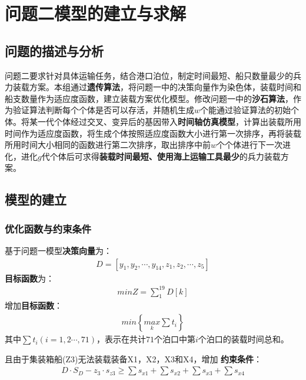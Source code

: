 \documentclass{whutmod}
\begin{document}
	  
	  
	
		
	\section{问题二模型的建立与求解}
	\subsection{问题的描述与分析}

	问题二要求针对具体运输任务，结合港口泊位，制定时间最短、船只数量最少的兵力装载方案。本组通过\textbf{遗传算法}，将问题一中的决策向量作为染色体，装载时间和船支数量作为适应度函数，建立装载方案优化模型。修改问题一中的\textbf{沙石算法}，作为验证算法判断每个个体是否可以存活，并随机生成$w$个能通过验证算法的初始个体。将某一代个体经过交叉、变异后的基因带入\textbf{时间轴仿真模型}，计算出装载所用时间作为适应度函数，将生成个体按照适应度函数大小进行第一次排序，再将装载所用时间大小相同的函数进行第二次排序，取出排序中前$w$个个体进行下一次进化，进化$g$代个体后可求得\textbf{装载时间最短、使用海上运输工具最少}的兵力装载方案。	                                                                                                   
	\subsection{模型的建立}
	    \subsubsection{优化函数与约束条件}
	基于问题一模型\textbf{决策向量}为：
	\begin{gather*}
	D=[y_{1},y_{2},\cdots,y_{14},z_{1},z_{2},\cdots,z_{5}]
	\end{gather*}
	\textbf{目标函数}为：
	\begin{gather}
	min Z=\sum _{1}^{19}D[k]
	\end{gather}
	增加\textbf{目标函数}：
		\begin{gather}
	min \left \{ \underset{k}{max}\sum t_{i} \right \}
	\end{gather}
	其中$\sum t_{i}(i=1,2\cdots,71)$，表示在共计$71$个泊口中第$i$个泊口的装载时间总和。	
	

	且由于集装箱船(Z3)无法装载装备X1，X2，X3和X4，增加	\textbf{约束条件}：
	\begin{gather}
	D \cdot S_{D} - z_{3} \cdot s_{z3} \geq  \sum s_{x1}+ \sum s_{x2}+\sum s_{x3}+ \sum s_{x4}
	\end{gather}
	
\end{document}
